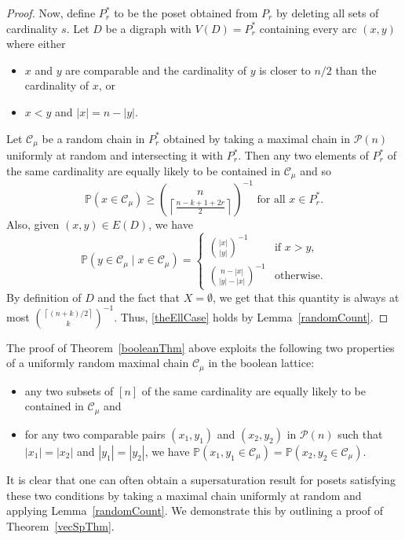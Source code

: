 \documentclass[11 pt]{article}
\theoremstyle{definition}
\theoremstyle{case}
\numberwithin{equation}{section}
\begin{document}
\begin{proof}
Now, define $P_r^*$ to be the poset obtained from $P_r$ by deleting all sets of cardinality $s$. Let $D$ be a digraph with $V(D)=P_r^*$ containing every arc $(x,y)$ where either
\begin{itemize}
\item $x$ and $y$ are comparable and the cardinality of $y$ is closer to $n/2$ than the cardinality of $x$, or
\item  $x<y$ and $|x| = n-|y|$.
\end{itemize}
Let $\mathcal{C}_\mu$ be a random chain in $P_r^*$ obtained by taking a maximal chain in $\mathcal{P}(n)$ uniformly at random and intersecting it with $P_r^*$. Then any two elements of $P_r^*$ of the same cardinality are equally likely to be contained in $\mathcal{C}_\mu$ and so
\[\mathbb{P}\left(x\in \mathcal{C}_\mu\right)\geq \binom{n}{\left\lceil \frac{n-k+1+2r}{2}\right\rceil}^{-1}\text{ for all $x\in P_r^*$}.\]
Also, given $(x,y)\in E(D)$, we have
\[\mathbb{P}\left(y\in \mathcal{C}_\mu\mid x\in\mathcal{C}_\mu\right) =\begin{cases}
\binom{|x|}{|y|}^{-1} & \text{if $x>y$},\\
\binom{n-|x|}{|y|-|x|}^{-1}& \text{otherwise}.
  \end{cases}
\]
By definition of $D$ and the fact that $X=\emptyset$, we get that this quantity is always at most $\binom{\left\lceil (n+k)/2\right\rceil}{k}^{-1}$. Thus, \eqref{theEllCase} holds by Lemma~\ref{randomCount}.
\end{proof}

The proof of Theorem~\ref{booleanThm} above exploits the following two properties of a uniformly random maximal chain $\mathcal{C}_\mu$ in the boolean lattice:
\begin{itemize}
\item  any two subsets of $[n]$ of the same cardinality are equally likely to be contained in $\mathcal{C}_\mu$ and
\item for any two comparable pairs $(x_1,y_1)$ and $(x_2,y_2)$ in $\mathcal{P}(n)$ such that $|x_1|=|x_2|$ and $|y_1|=|y_2|$, we have $\mathbb{P}\left(x_1,y_1\in\mathcal{C}_\mu\right) = \mathbb{P}\left(x_2,y_2\in\mathcal{C}_\mu\right)$.
\end{itemize}
It is clear that one can often obtain a supersaturation result for posets satisfying these two conditions by taking a maximal chain uniformly at random and applying Lemma~\ref{randomCount}. We demonstrate this by outlining a proof of Theorem~\ref{vecSpThm}.
\end{document}
